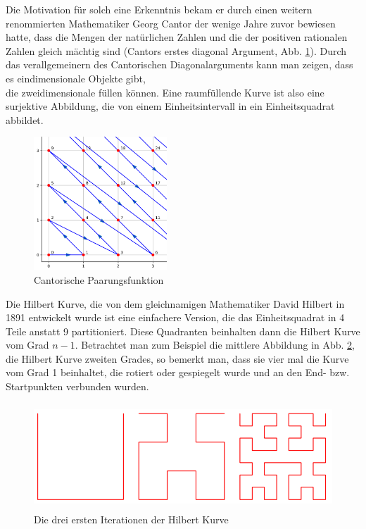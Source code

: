 \documentclass[course=erap]{aspdoc}
\begin{document}
\newpage
Die Motivation für solch eine Erkenntnis bekam er durch einen weitern  renommierten Mathematiker Georg Cantor der wenige Jahre zuvor bewiesen hatte, dass die Mengen der natürlichen Zahlen und die der positiven rationalen Zahlen gleich mächtig sind (Cantors erstes diagonal Argument, Abb. \ref{fig:Cantor}). 
Durch das verallgemeinern des Cantorischen Diagonalarguments kann man zeigen, dass es eindimensionale Objekte gibt, \\ die zweidimensionale füllen können. Eine raumfüllende Kurve ist also eine surjektive Abbildung, die von einem Einheitsintervall in ein Einheitsquadrat abbildet.
\begin{figure}[h]
\centering
     \includegraphics[width=5cm, height=5cm]{Cantor}
    \caption{Cantorische Paarungsfunktion}
    \label{fig:Cantor}
\end{figure}
Die Hilbert Kurve, die von dem gleichnamigen Mathematiker David Hilbert in 1891 entwickelt wurde ist eine einfachere Version, die das Einheitsquadrat in 4 Teile anstatt 9 partitioniert. Diese Quadranten beinhalten dann die Hilbert Kurve vom Grad $n - 1$. Betrachtet man zum Beispiel die mittlere Abbildung in Abb. \ref{fig:hilbertCurve}, die Hilbert Kurve zweiten Grades, so bemerkt man, dass sie vier mal die Kurve vom Grad 1 beinhaltet, die rotiert oder gespiegelt wurde und an den End- bzw. Startpunkten verbunden wurden.
\begin{figure}[h]
\centering
   \includegraphics[width=12cm, height=4cm]{Hilbert}
    \caption{Die drei ersten Iterationen der Hilbert Kurve}
    \label{fig:hilbertCurve}
\end{figure}
\end{document}
